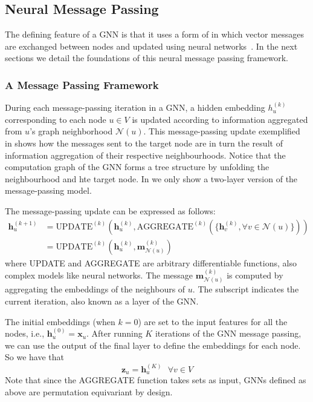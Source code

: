 \subsection{Neural Message Passing}
The defining feature of a GNN is that it uses a form of  in which vector messages are exchanged between nodes and updated using neural networks~\cite{Gilmer2017neuralMessagePassing}. In the next sections we detail the foundations of this neural message passing framework.

\subsubsection{A Message Passing Framework}
During each message-passing iteration in a GNN, a hidden embedding $h_u^{(k)}$ corresponding to each node $u\in V$ is updated according to information aggregated
from $u$’s graph neighborhood $\mathcal{N} (u)$. This message-passing update exemplified in  shows how the messages sent to the target node are in turn the result of information aggregation of their respective neighbourhoods. Notice that the computation graph of the GNN forms a tree structure by unfolding the neighbourhood and hte target node. In  we only show a two-layer version of the message-passing model.



The message-passing update can be expressed as follows:
\begin{align*}
    \mathbf{h}_u^{(k+1)} &= \text{UPDATE}^{(k)}\left(\mathbf{h}_u^{(k)}, \text{AGGREGATE}^{(k)}(\{\mathbf{h}_v^{(k)}, \forall v \in \mathcal{N}(u)\})\right) \\
    &= \text{UPDATE}^{(k)}\left(\mathbf{h}_u^{(k)}, \mathbf{m}_{\mathcal{N}(u)}^{(k)}\right)
\end{align*}
where UPDATE and AGGREGATE are arbitrary differentiable functions, also complex models like neural networks. The message $\mathbf{m}_{\mathcal{N}(u)}^{(k)}$ is computed by aggregating the embeddings of the neighbours of $u$. The subscript indicates the current iteration, also known as a layer of the GNN.

The initial embeddings (when $k=0$) are set to the input features for all the nodes, i.e., $\mathbf{h}_u^{(0)} = \mathbf{x}_u$. After running $K$ iterations of the GNN message passing, we can use the output of the final layer to define the embeddings for each node. So we have that
\begin{equation*}
    \mathbf{z}_u=\mathbf{h}_u^{(K)} \text{   }\forall v \in V
\end{equation*}
Note that since the AGGREGATE function takes sets as input, GNNs defined as above are permutation equivariant by design.

